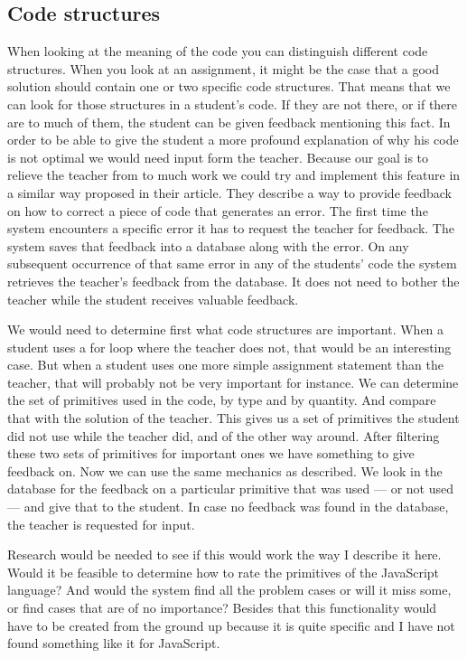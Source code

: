 \documentclass{article}
\begin{document}
\subsection{Code structures}

When looking at the meaning of the code you can distinguish different code
structures. When you look at an assignment, it might be the case that a good
solution should contain one or two specific code structures. That means that we
can look for those structures in a student's code. If they are not there, or if
there are to much of them, the student can be given feedback mentioning this
fact. In order to be able to give the student a more profound explanation of
why his code is not optimal we would need input form the teacher. Because our
goal is to relieve the teacher from to much work we could try and implement
this feature in a similar way \citet[Section 3.2]{watson2011learning} proposed
in their article. They describe a way to provide feedback on how to correct a
piece of code that generates an error. The first time the system encounters a
specific error it has to request the teacher for feedback. The system saves
that feedback into a database along with the error. On any subsequent
occurrence of that same error in any of the students' code the system retrieves
the teacher's feedback from the database. It does not need to bother the
teacher while the student receives valuable feedback.

We would need to determine first what code structures are important. When a
student uses a for loop where the teacher does not, that would be an
interesting case. But when a student uses one more simple assignment statement
than the teacher, that will probably not be very important for instance. We can
determine the set of primitives used in the code, by type and by quantity. And
compare that with the solution of the teacher. This gives us a set of
primitives the student did not use while the teacher did, and of the other way
around. After filtering these two sets of primitives for important ones we have
something to give feedback on. Now we can use the same mechanics as
\citet{watson2011learning} described. We look in the database for the feedback
on a particular primitive that was used --- or not used --- and give that to
the student. In case no feedback was found in the database, the teacher is
requested for input.

Research would be needed to see if this would work the way I describe it
here. Would it be feasible to determine how to rate the primitives of the
JavaScript language? And would the system find all the problem cases or will it
miss some, or find cases that are of no importance? Besides that this functionality would have to be created from the ground up because it is quite specific and I have not found something like it for JavaScript.
\end{document}
